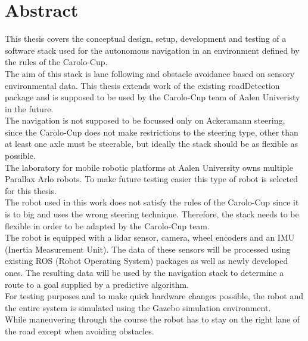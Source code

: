 \chapter*{Abstract}
\label{abstract}
This thesis covers the conceptual design, setup, development and testing of a software stack used for the autonomous navigation in an environment defined by the rules of the Carolo-Cup.\\

 The aim of this stack is lane following and obstacle avoidance based on sensory environmental data. This thesis extends work of the existing roadDetection package and is supposed to be used by the Carolo-Cup team of Aalen Univeristy in the future.\\
 
 The navigation is not supposed to be focussed only on Ackeramann steering, since the Carolo-Cup does not make restrictions to the steering type, other than at least one axle must be steerable, but ideally the stack should be as flexible as possible\cite{carolocup}.\\
 The laboratory for mobile robotic platforms at Aalen University owns multiple Parallax Arlo robots. To make future testing easier this type of robot is selected for this thesis.\\

 The robot used in this work does not satisfy the rules of the Carolo-Cup since it is to big and uses the wrong steering technique. Therefore, the stack needs to be flexible in order to be adapted by the Carolo-Cup team.\\

The robot is equipped with a lidar sensor, camera, wheel encoders and an IMU (Inertia Measurement Unit). The data of these sensors will be processed using existing ROS (Robot Operating System) packages as well as newly developed ones. The resulting data will be used by the navigation stack to determine a route to a goal supplied by a predictive algorithm.\\

For testing purposes and to make quick hardware changes possible, the robot and the entire system is simulated using the Gazebo simulation environment.\\

While maneuvering through the course the robot has to stay on the right lane of the road except when avoiding obstacles.